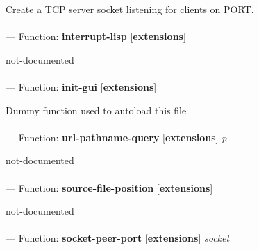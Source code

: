 \begin{adjustwidth}{5em}{5em}
Create a TCP server socket listening for clients on PORT.
\end{adjustwidth}

\paragraph{}
\label{EXTENSIONS:INTERRUPT-LISP}
--- Function: \textbf{interrupt-lisp} [\textbf{extensions}] \textit{}

\begin{adjustwidth}{5em}{5em}
not-documented
\end{adjustwidth}

\paragraph{}
\label{EXTENSIONS:INIT-GUI}
--- Function: \textbf{init-gui} [\textbf{extensions}] \textit{}

\begin{adjustwidth}{5em}{5em}
Dummy function used to autoload this file
\end{adjustwidth}

\paragraph{}
\label{EXTENSIONS:URL-PATHNAME-QUERY}
--- Function: \textbf{url-pathname-query} [\textbf{extensions}] \textit{p}

\begin{adjustwidth}{5em}{5em}
not-documented
\end{adjustwidth}

\paragraph{}
\label{EXTENSIONS:SOURCE-FILE-POSITION}
--- Function: \textbf{source-file-position} [\textbf{extensions}] \textit{}

\begin{adjustwidth}{5em}{5em}
not-documented
\end{adjustwidth}

\paragraph{}
\label{EXTENSIONS:SOCKET-PEER-PORT}
--- Function: \textbf{socket-peer-port} [\textbf{extensions}] \textit{socket}

